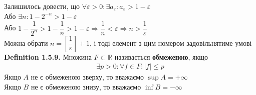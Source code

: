 \documentclass[a4paper, 14pt]{extarticle}
\def\bigline{\vspace{5mm}\\}
\def\bigline{\vspace{5mm}\\}
\begin{document}
	Залишилось довести, що $\forall \varepsilon > 0: \exists a_{\varepsilon}: a_{\varepsilon} > 1 - \varepsilon$\\
	Або $\exists n: 1 - 2^{-n} > 1 -\varepsilon$\\
	Або $1 - \dfrac{1}{2^n} > 1 - \dfrac{1}{n} > 1 - \varepsilon \Rightarrow \dfrac{1}{n} < \varepsilon \Rightarrow n > \dfrac{1}{\varepsilon}$\\
	Можна обрати $n = \left[ \dfrac{1}{\varepsilon} \right] + 1$, і тоді елемент з цим номером задовільнятиме умові
	\bigline
	\textbf{Definition 1.5.9.} Множина $F \subset \mathbb{R}$ називається \textbf{обмеженою}, якщо
	\begin{align*}
	\exists p>0: \forall f \in F: |f| \leq p
	\end{align*}
	Якщо $A$ не є обмеженою зверху, то вважаємо $\sup A = +\infty$\\
	Якщо $B$ не є обмеженою знизу, то вважаємо $\inf B = -\infty$\\
	
	
	
\end{document}
